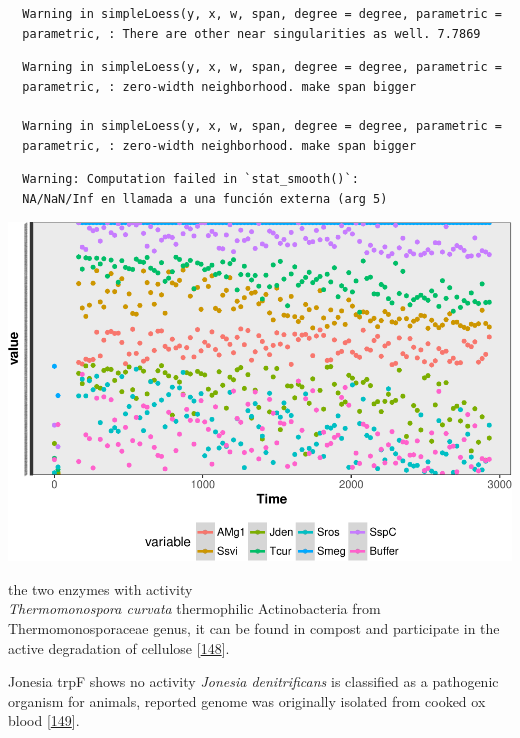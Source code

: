 \documentclass[12pt,twoside]{reedthesis}
\begin{document}
  \begin{verbatim}
  Warning in simpleLoess(y, x, w, span, degree = degree, parametric =
  parametric, : There are other near singularities as well. 7.7869
  \end{verbatim}
  
  \begin{verbatim}
  Warning in simpleLoess(y, x, w, span, degree = degree, parametric =
  parametric, : zero-width neighborhood. make span bigger
  
  Warning in simpleLoess(y, x, w, span, degree = degree, parametric =
  parametric, : zero-width neighborhood. make span bigger
  \end{verbatim}
  
  \begin{verbatim}
  Warning: Computation failed in `stat_smooth()`:
  NA/NaN/Inf en llamada a una función externa (arg 5)
  \end{verbatim}
  
  \begin{center}\includegraphics{tesis_files/figure-latex/activity-4} \end{center}
  
  the two enzymes with activity\\
  \emph{Thermomonospora curvata} thermophilic Actinobacteria from
  Thermomonosporaceae genus, it can be found in compost and participate in
  the active degradation of cellulose
  {[}\protect\hyperlink{ref-chertkov_complete_2011}{148}{]}.
  
  Jonesia trpF shows no activity \emph{Jonesia denitrificans} is
  classified as a pathogenic organism for animals, reported genome was
  originally isolated from cooked ox blood
  {[}\protect\hyperlink{ref-pukall_complete_2009}{149}{]}.
  
\end{document}
